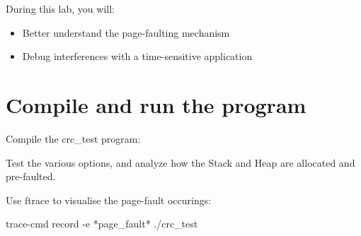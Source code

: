 
During this lab, you will:
\begin{itemize}
  \item Better understand the page-faulting mechanism
  \item Debug interferences with a time-sensitive application
\end{itemize}

\section{Compile and run the program}

Compile the crc\_test program: 

Test the various options, and analyze how the Stack and Heap are allocated and
pre-faulted.

Use ftrace to visualise the page-fault occurings:
\begin{bashinput}
        trace-cmd record -e *page_fault* ./crc_test
\end{bashinput}

